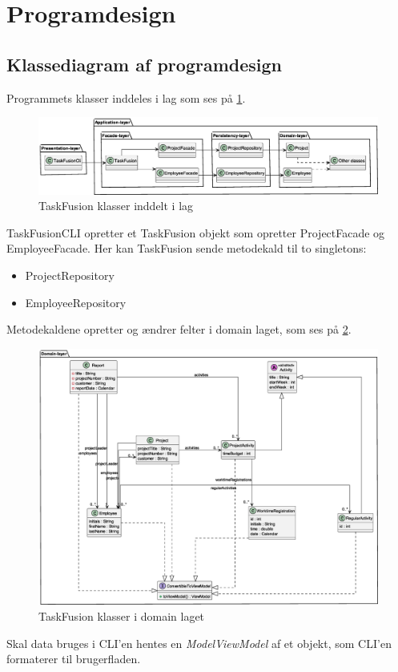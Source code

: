 \section{Programdesign}
\subsection{Klassediagram af programdesign}
Programmets klasser inddeles i lag som ses på \cref{fig:classLayers}.
\begin{figure}
    \centering
    \caption{TaskFusion klasser inddelt i lag}\label{fig:classLayers}
    \includegraphics[width=\textwidth]{TaskFusion/out/assets/diagrams/class_persistency_layer/ClassDiagram_layer.eps}
\end{figure}
TaskFusionCLI opretter et TaskFusion objekt som opretter ProjectFacade og EmployeeFacade. Her kan TaskFusion sende metodekald til to singletons:
\begin{itemize}
    \item ProjectRepository
    \item EmployeeRepository
\end{itemize}
Metodekaldene opretter og ændrer felter i domain laget, som ses på \cref{fig:domainLayer}.
\begin{figure}
    \centering
    \caption{TaskFusion klasser i domain laget}\label{fig:domainLayer}
    \includegraphics[width=\textwidth]{TaskFusion/out/assets/diagrams/class_persistency_domain/ClassDiagram_domain.eps}
\end{figure}
Skal data bruges i CLI'en hentes en \textit{ModelViewModel} af et objekt, som CLI'en formaterer til brugerfladen.
\newpage
